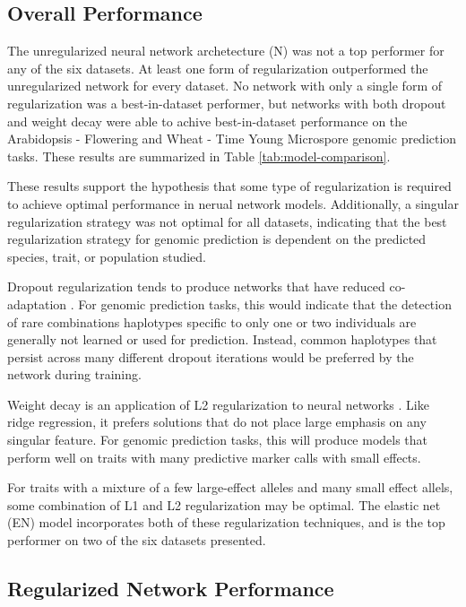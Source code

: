 
\subsection*{Overall Performance}

The unregularized neural network archetecture (N) was not a top performer for any of the six datasets. 
At least one form of regularization outperformed the unregularized network for every dataset. 
No network with only a single form of regularization was a best-in-dataset performer, but networks 
with both dropout and weight decay were able to achive best-in-dataset performance on the Arabidopsis 
- Flowering and Wheat - Time Young Microspore genomic prediction tasks. These results are summarized 
in Table \ref{tab:model-comparison}.

These results support the hypothesis that some type of regularization is required to achieve
optimal performance in nerual network models. Additionally, a singular regularization strategy was
not optimal for all datasets, indicating that the best regularization strategy for genomic prediction
is dependent on the predicted species, trait, or population studied. 

Dropout regularization tends to produce networks 
that have reduced co-adaptation \citep{srivastava2014}. For genomic prediction tasks, this would
indicate that the detection of rare combinations haplotypes specific to only one
or two individuals are generally not learned or used for prediction. Instead, common haplotypes that persist across many
different dropout iterations would be preferred by the network during training.

Weight decay is an application of L2 regularization to neural networks \citep{krogh1992}. Like ridge regression, it prefers
solutions that do not place large emphasis on any singular feature. For genomic prediction tasks, 
this will produce models that perform well on traits with many predictive marker calls 
with small effects. 

For traits with a mixture of a few large-effect alleles and many small effect allels, some combination of 
L1 and L2 regularization may be optimal. The elastic net (EN) model incorporates both of these regularization
techniques, and is the top performer on two of the six datasets presented.


\ifdefined\showtablesandfigures
\fi

\subsection*{Regularized Network Performance}

